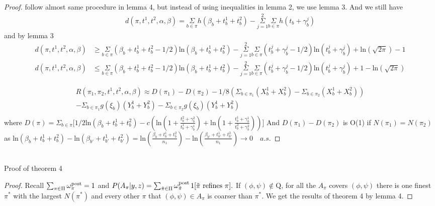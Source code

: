 \documentclass[aoas,preprint]{imsart}
\begin{document}
\begin{proof}
follow almost same procedure in lemma 4, but instead of using inequalities in lemma 2, we use lemma 3. And we still have
\begin{eqnarray*}
d(\pi, t^1, t^2, \alpha, \beta) = \underset{b\in \pi}\Sigma h(\beta_b + t_b^1 + t_b^2) - \overset{2}{\underset{j = 1}{\Sigma}} \underset{b\in \pi}\Sigma h(t_b + \gamma_b^j)
\end{eqnarray*}
and by lemma 3
\begin{align}
d(\pi, t^1, t^2, \alpha, \beta) &\geq \underset{b\in \pi}\Sigma (\beta_b + t_b^1 + t_b^2 - 1/2) \text{ln}(\beta_b  + t_b^1 + t_b^2) - \overset{2}{\underset{j = 1}{\Sigma}}\underset{b\in\pi}\Sigma (t_b^j + \gamma_b^j - 1/2) \text{ln}(t_b^j + \gamma_b^j) + \text{ln}(\sqrt{2\pi}) - 1\\
d(\pi, t^1, t^2, \alpha, \beta) &\leq \underset{b\in \pi}\Sigma (\beta_b + t_b^1 + t_b^2 - 1/2) \text{ln}(\beta_b  + t_b^1 + t_b^2) - \overset{2}{\underset{j = 1}{\Sigma}}\underset{b\in\pi}\Sigma (t_b^j + \gamma_b^j - 1/2) \text{ln}(t_b^j + \gamma_b^j) + 1 - \text{ln}(\sqrt{2\pi})
\end{align}

\begin{eqnarray*}
R(\pi_1, \pi_2, t^1, t^2, \alpha, \beta)  \approx D(\pi_1) - D(\pi_2) - 1/8 (\Sigma_{b\in\pi_1}(X_b^1 + X_b^2) - \Sigma_{b\in\pi_2}(X_b^1 + X_b^2)) \\ 
 - \Sigma_{b\in\pi_1}g(\xi_b)(Y_b^1 + Y_b^2)  - \Sigma_{b\in\pi_2}g(\xi_ b)(Y_b^1 + Y_b^2)\\
\end{eqnarray*}
where $D(\pi) = \Sigma_{b\in\pi}\big[1/2 \text{ln}(\beta_b + t_b^1 + t_b^2) 
  - c(\text{ln}(1 + \frac{t_b^2 + \gamma_b^2}{t_b^1 + \gamma_b^1}) + \text{ln}(1 + \frac{t_b^1 + \gamma_b^1}{t_b^2 + \gamma_b^2}))\big]$
And $D(\pi_1) - D(\pi_2)$ is O(1) if $N(\pi_1) = N(\pi_2)$ as $ \text{ln}(\beta_b + t_b^1 + t_b^2)  -  \text{ln}(\beta_{b'} + t_{b'}^1 + t_{b'}^2) =  \text{ln}(\frac{\beta_b + t_b^1 + t_b^2}{n_1})  -  \text{ln}(\frac{\beta_{b'} + t_{b'}^1 + t_{b'}^2}{n_1}) \rightarrow 0 \quad a.s.$


\end{proof}



\hfill\\
Proof of theorem 4 
\begin{proof}

Recall $\sum_{\pi \in \Pi} \omega^{\rm post}_{ \pi} = 1$ and $P(A_\pi|y,z) = 
\sum_{\tilde \pi \in \Pi} \omega^{\rm post}_{\tilde \pi} \,  1[ {\mbox {\rm $\tilde \pi$ refines $\pi$}} ].$  If $(\phi, \psi) \notin \text{Q}$, for all the $A_\pi$ covers $(\phi, \psi)$ there is one finest $\pi^*$ with the largest $N(\pi^*)$ and every other $\pi$ that $(\phi,\psi) \in A_\pi$ is coarser than $\pi^*$. We get the results of theorem 4 by lemma 4.


\end{proof}
\end{document}
